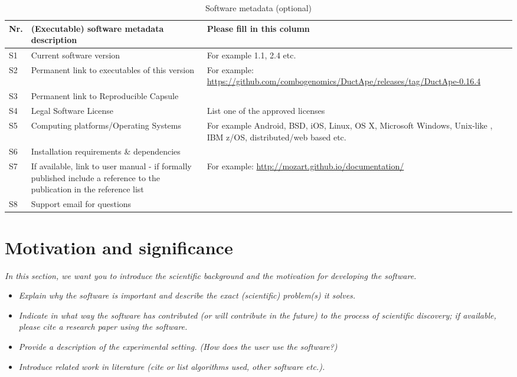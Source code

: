 \documentclass[preprint,12pt, a4paper]{elsarticle}
\begin{document}
\begin{table}[ht]
\begin{tabular}{|l|p{6.5cm}|p{6.5cm}|}
\hline
\textbf{Nr.} & \textbf{(Executable) software metadata description} & \textbf{Please fill in this column} \\
\hline
S1 & Current software version & For example 1.1, 2.4 etc. \\
\hline
S2 & Permanent link to executables of this version  & For example: \url{https://github.com/combogenomics/DuctApe/releases/tag/DuctApe-0.16.4} \\
\hline
S3  & Permanent link to Reproducible Capsule & \\
\hline
S4 & Legal Software License & List one of the approved licenses \\
\hline
S5 & Computing platforms/Operating Systems & For example Android, BSD, iOS, Linux, OS X, Microsoft Windows, Unix-like , IBM z/OS, distributed/web based etc. \\
\hline
S6 & Installation requirements \& dependencies & \\
\hline
S7 & If available, link to user manual - if formally published include a reference to the publication in the reference list & For example: \url{http://mozart.github.io/documentation/} \\
\hline
S8 & Support email for questions & \\
\hline
\end{tabular}
\caption{Software metadata (optional)}
\label{executabelMetadata} 
\end{table}


\section{Motivation and significance}
\textit{In this section, we want you to introduce the scientific background and the motivation for developing the software.}

\begin{itemize}
    \item \textit{Explain why the software is important and describe the exact (scientific) problem(s) it solves.}
    \item \textit{Indicate in what way the software has contributed (or will contribute in the future) to the process of scientific discovery; if available, please cite a research paper using the software.}
    \item \textit{Provide a description of the experimental setting. (How does the user use the software?)}
    \item \textit{Introduce related work in literature (cite or list algorithms used, other software etc.).}
\end{itemize}
\end{document}
